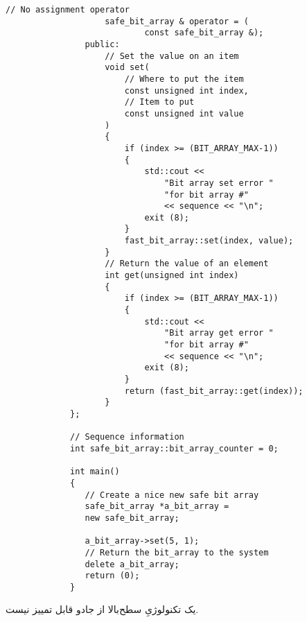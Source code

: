 \begin{LTR}
\begin{lstlisting}[style=C++Style]
             		// No assignment operator
             		safe_bit_array & operator = (
             				const safe_bit_array &);
             	public:
             		// Set the value on an item
             		void set(
             			// Where to put the item
             			const unsigned int index,
             			// Item to put
             			const unsigned int value
             		)
             		{
             			if (index >= (BIT_ARRAY_MAX-1))
             			{
             				std::cout <<
             					"Bit array set error "
             					"for bit array #"
             					<< sequence << "\n";
             				exit (8);
             			}
             			fast_bit_array::set(index, value);
             		}
             		// Return the value of an element
             		int get(unsigned int index)
             		{
             			if (index >= (BIT_ARRAY_MAX-1))
             			{
             				std::cout <<
             					"Bit array get error "
             					"for bit array #"
             					<< sequence << "\n";
             				exit (8);
             			}
             			return (fast_bit_array::get(index));
             		}
             };

             // Sequence information
             int safe_bit_array::bit_array_counter = 0;

             int main()
             {
             	// Create a nice new safe bit array
             	safe_bit_array *a_bit_array =
             	new safe_bit_array;

             	a_bit_array->set(5, 1);
             	// Return the bit_array to the system
             	delete a_bit_array;
             	return (0);
             }
        \end{lstlisting}
\end{LTR}

\begin{tcolorbox}
    یک تکنولوژیِ سطح‌بالا از جادو قابل تمییز نیست.
    \LTR
\end{tcolorbox}
